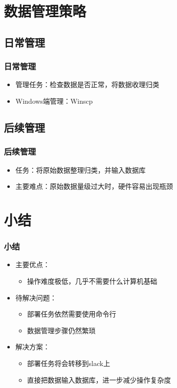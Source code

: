 \documentclass{beamer}
\begin{document}
\section{数据管理策略}
\subsection{日常管理}
\begin{frame}
\frametitle{日常管理}
\begin{itemize}
\item 管理任务：检查数据是否正常，将数据收理归类
\item Windows端管理：Winscp
\end{itemize}
\end{frame}

\subsection{后续管理}
\begin{frame}
\frametitle{后续管理}
\begin{itemize}
\item 任务：将原始数据整理归类，并输入数据库
\item 主要难点：原始数据量级过大时，硬件容易出现瓶颈
\end{itemize}
\end{frame}


\section{小结}
\begin{frame}
\frametitle{小结}
\begin{itemize}
  \item 主要优点：
  \begin{itemize}
  \item 操作难度极低，几乎不需要什么计算机基础
  \end{itemize}
  \item 待解决问题：
  \begin{itemize}
    \item 部署任务依然需要使用命令行
    \item 数据管理步骤仍然繁琐
  \end{itemize}
  \item 解决方案：
  \begin{itemize}
    \item 部署任务将会转移到slack上
    \item 直接把数据输入数据库，进一步减少操作复杂度
  \end{itemize}
\end{itemize}
\end{frame}
\end{document}
